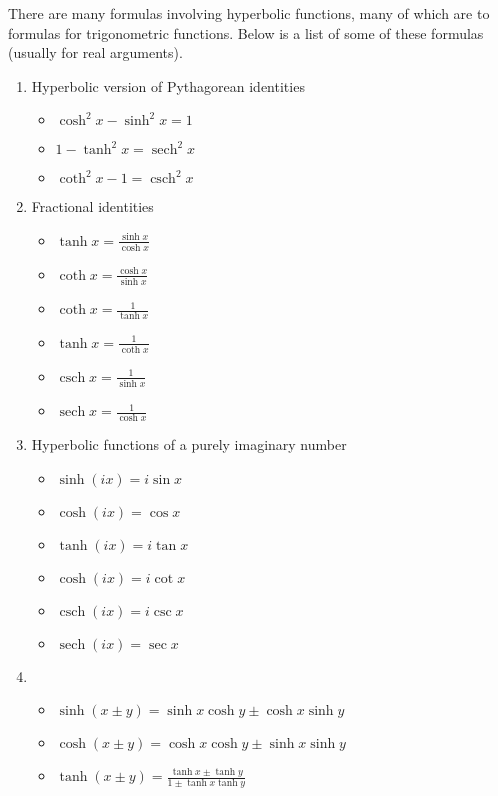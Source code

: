 \documentclass[12pt]{article}
\newcommand{\sech}{\operatorname{sech}}
\newcommand{\csch}{\operatorname{csch}}
\newcommand{\ds}{\displaystyle}
\begin{document}

There are many formulas involving hyperbolic functions, many of which are  to formulas for trigonometric functions.  Below is a list of some of these formulas (usually for real arguments).

\begin{enumerate}
\item Hyperbolic version of Pythagorean identities

\begin{itemize}
\item $\cosh^2 x-\sinh^2 x=1$
\item $1-\tanh^2 x=\sech^2 x$
\item $\coth^2 x-1=\csch^2 x$
\end{itemize}

\item Fractional identities

\begin{itemize}
\item $\ds \tanh x=\frac{\sinh x}{\cosh x}$
\item $\ds \coth x=\frac{\cosh x}{\sinh x}$
\item $\ds \coth x=\frac{1}{\tanh x}$
\item $\ds \tanh x=\frac{1}{\coth x}$
\item $\ds \csch x=\frac{1}{\sinh x}$
\item $\ds \sech x=\frac{1}{\cosh x}$
\end{itemize}

\item Hyperbolic functions of a purely imaginary number

\begin{itemize}
\item $\sinh(ix)=i\sin x$
\item $\cosh(ix)=\cos x$
\item $\tanh(ix)=i\tan x$
\item $\cosh(ix)=i\cot x$
\item $\csch(ix)=i\csc x$
\item $\sech(ix)=\sec x$
\end{itemize}

\item {}

\begin{itemize}
\item $\sinh(x\pm y)=\sinh x\cosh y\pm\cosh x\sinh y$
\item $\cosh(x\pm y)=\cosh x\cosh y\pm\sinh x\sinh y$
\item $\ds \tanh(x\pm y)=\frac{\tanh x\pm\tanh y}{1\pm\tanh x\tanh y}$
\end{itemize}


\end{enumerate}
\end{document}
